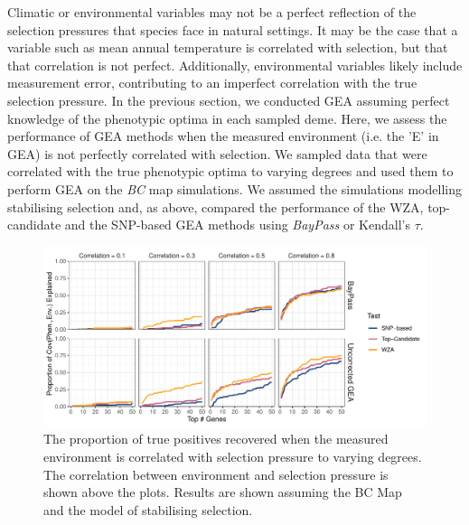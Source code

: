 \documentclass[10pt,twoside,lineno, twocolumn]{GSA_format}
\begin{document}
Climatic or environmental variables may not be a perfect reflection of the selection pressures that species face in natural settings. It may be the case that a variable such as mean annual temperature is correlated with selection, but that that correlation is not perfect. Additionally, environmental variables likely include measurement error, contributing to an imperfect correlation with the true selection pressure. In the previous section, we conducted GEA assuming perfect knowledge of the phenotypic optima in each sampled deme. Here, we assess the performance of GEA methods when the measured environment (i.e. the 'E' in GEA) is not perfectly correlated with selection. We sampled data that were correlated with the true phenotypic optima to varying degrees and used them to perform GEA on the \textit{BC} map simulations. We assumed the simulations modelling stabilising selection and, as above, compared the performance of the WZA, top-candidate and the SNP-based GEA methods using \textit{BayPass} or Kendall's $\tau$. \\



\begin{figure}
  \includegraphics[width=0.6\linewidth]{Plots/correlatedEnvironments_BCmapResults.pdf} 
  \caption{The proportion of true positives recovered when the measured environment is correlated with selection pressure to varying degrees. The correlation between environment and selection pressure is shown above the plots. Results are shown assuming the BC Map and the model of stabilising selection.}

  \label{fig:truePosCorrelated}
\end{figure}
\end{document}
